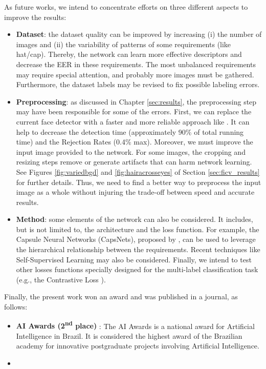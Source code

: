 
As future works, we intend to concentrate efforts on three different aspects to improve the results:

\begin{itemize}
\item \textbf{Dataset}: the dataset quality can be improved by increasing (i) the number of images and (ii) the variability of patterns of some requirements (like hat/cap). Thereby, the network can learn more effective descriptors and decrease the EER in these requirements. The most unbalanced requirements may require special attention, and probably more images must be gathered. Furthermore, the dataset labels may be revised to fix possible labeling errors.

\item \textbf{Preprocessing}: as discussed in Chapter \ref{sec:results}, the preprocessing step may have been responsible for some of the errors. First, we can replace the current face detector with a faster and more reliable approach like \cite{faceboxes}. It can help to decrease the detection time (approximately 90\% of total running time) and the Rejection Rates (0.4\% max). Moreover, we must improve the input image provided to the network. For some images, the cropping and resizing steps remove or generate artifacts that can harm network learning. See Figures \ref{fig:variedbgd} and \ref{fig:hairacrosseyes} of Section \ref{sec:ficv_results} for further details. Thus, we need to find a better way to preprocess the input image as a whole without injuring the trade-off between speed and accurate results.

\item \textbf{Method}: some elements of the network can also be considered. It includes, but is not limited to, the architecture and the loss function. For example, the Capsule Neural Networks (CapsNets), proposed by \cite{sabour2017dynamic}, can be used to leverage the hierarchical relationship between the requirements. Recent techniques like Self-Supervised Learning \citep{doersch2017multi} may also be considered. Finally, we intend to test other losses functions specially designed for the multi-label classification task (e.g., the Contrastive Loss \citep{khosla2020supervised}).
\end{itemize}

Finally, the present work won an award and was published in a journal, as follows:

\begin{itemize}
\item \textbf{AI Awards (2\textsuperscript{nd} place)} \citep{aiaward}: The AI Awards is a national award for Artificial Intelligence in Brazil. It is considered the highest award of the Brazilian academy for innovative postgraduate projects involving Artificial Intelligence.

\item {}
\end{itemize}